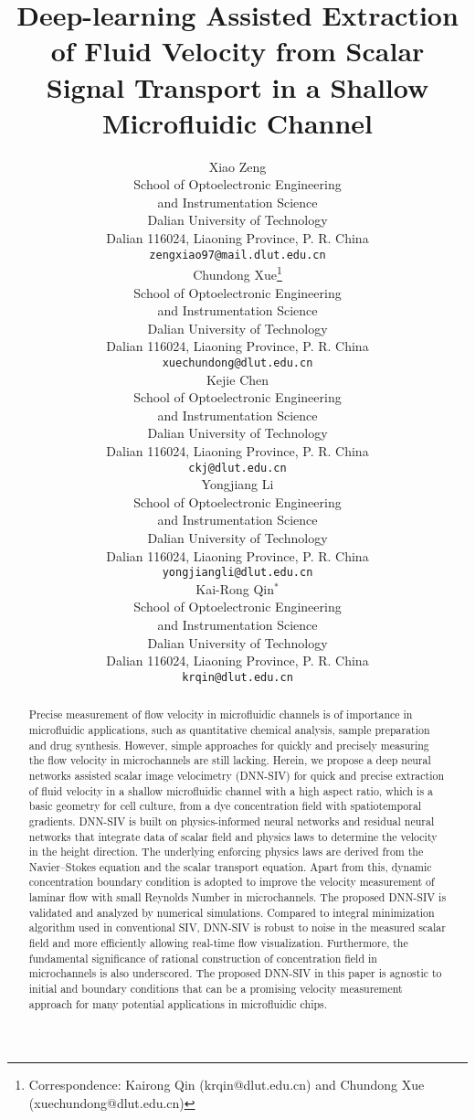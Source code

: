 \documentclass{article}
\title{Deep-learning Assisted Extraction of Fluid Velocity from Scalar Signal Transport in a Shallow Microfluidic Channel}
\author{Xiao Zeng\\
	School of Optoelectronic Engineering \\and Instrumentation Science\\
	Dalian University of Technology\\
	Dalian 116024, Liaoning Province, P. R. China\\
	\texttt{zengxiao97@mail.dlut.edu.cn}\\
	\And
	Chundong Xue\thanks{Correspondence: Kairong Qin (krqin@dlut.edu.cn) and Chundong Xue (xuechundong@dlut.edu.cn)}\\
	School of Optoelectronic Engineering \\and Instrumentation Science\\
	Dalian University of Technology\\
	Dalian 116024, Liaoning Province, P. R. China\\
	\texttt{xuechundong@dlut.edu.cn}\\
	\And
	Kejie Chen\\
	School of Optoelectronic Engineering \\and Instrumentation Science\\
	Dalian University of Technology\\
	Dalian 116024, Liaoning Province, P. R. China\\
	\texttt{ckj@dlut.edu.cn}\\
	\And
	Yongjiang Li\\
	School of Optoelectronic Engineering \\and Instrumentation Science\\
	Dalian University of Technology\\
	Dalian 116024, Liaoning Province, P. R. China\\
	\texttt{yongjiangli@dlut.edu.cn}\\
	\And
	Kai-Rong Qin$^{*}$\\
	School of Optoelectronic Engineering \\and Instrumentation Science\\
	Dalian University of Technology\\
	Dalian 116024, Liaoning Province, P. R. China\\
	\texttt{krqin@dlut.edu.cn}
}
\date{}
\begin{document}
\maketitle

\begin{abstract}
Precise measurement of flow velocity in microfluidic channels is of importance in microfluidic applications, such as quantitative chemical analysis, sample preparation and drug synthesis. However, simple approaches for quickly and precisely measuring the flow velocity in microchannels are still lacking. Herein, we propose a deep neural networks assisted scalar image velocimetry (DNN-SIV) for quick and precise extraction of fluid velocity in a shallow microfluidic channel with a high aspect ratio, which is a basic geometry for cell culture, from a dye concentration field with spatiotemporal gradients. DNN-SIV is built on physics-informed neural networks and residual neural networks that integrate data of scalar field and physics laws to determine the velocity in the height direction. The underlying enforcing physics laws are derived from the Navier–Stokes equation and the scalar transport equation. Apart from this, dynamic concentration boundary condition is adopted to improve the velocity measurement of laminar flow with small Reynolds Number in microchannels. The proposed DNN-SIV is validated and analyzed by numerical simulations. Compared to integral minimization algorithm used in conventional SIV, DNN-SIV is robust to noise in the measured scalar field and more efficiently allowing real-time flow visualization. Furthermore, the fundamental significance of rational construction of concentration field in microchannels is also underscored. The proposed DNN-SIV in this paper is agnostic to initial and boundary conditions that can be a promising velocity measurement approach for many potential applications in microfluidic chips.
\end{abstract}

\end{document}
